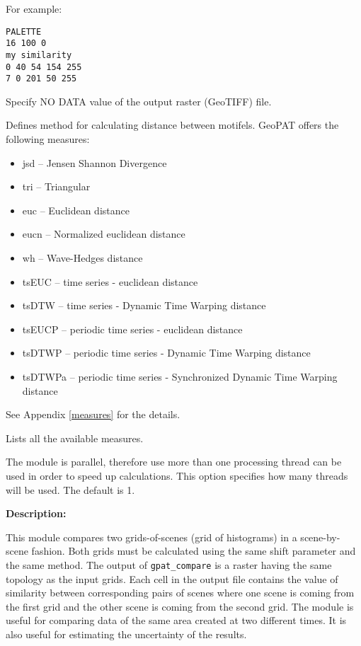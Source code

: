 For example: \\
\begin{minipage}{\linewidth}
\begin{lstlisting}
PALETTE
16 100 0
my similarity
0 40 54 154 255
7 0 201 50 255
\end{lstlisting}
\end{minipage}


Specify NO DATA value of the output raster (GeoTIFF) file.


Defines method for calculating distance between motifels. 
GeoPAT offers the following measures: 
\begin{itemize}
	\item jsd -- Jensen Shannon Divergence
	\item tri -- Triangular
	\item euc -- Euclidean distance
	\item eucn -- Normalized euclidean distance
	\item wh -- Wave-Hedges distance
	\item tsEUC -- time series - euclidean distance
	\item tsDTW -- time series - Dynamic Time Warping distance
	\item tsEUCP -- periodic time series - euclidean distance
	\item tsDTWP -- periodic time series - Dynamic Time Warping distance
	\item tsDTWPa -- periodic time series - Synchronized Dynamic Time Warping distance
\end{itemize}
See Appendix \ref{measures} for the details.


Lists all the available measures.


The module is parallel, therefore use more than one processing thread can be used in order to speed up calculations. 
This option specifies how many threads will be used. 
The default is 1.

{\bf Description:}

This module compares two grids-of-scenes (grid of histograms) in a scene-by-scene fashion. 
Both grids must be calculated using the same shift parameter and the same method.
The output of {\tt gpat\_compare} is a raster having the same topology as the input grids.
Each cell in the output file contains the value of similarity between corresponding pairs of scenes where one scene is coming from the first grid and the other scene is coming from the second grid.
The module is useful for comparing data of the same area created at two different times.
It is also useful for estimating the uncertainty of the results.

